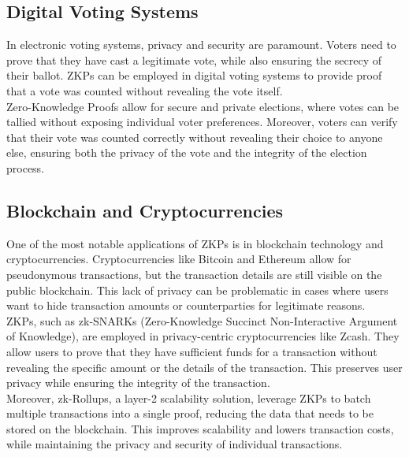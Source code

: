 \subsection{Digital Voting Systems}

In electronic voting systems, privacy and security are paramount. Voters need to prove that they have cast a legitimate vote, while also ensuring the secrecy of their ballot. ZKPs can be employed in digital voting systems to provide proof that a vote was counted without revealing the vote itself.
\\
Zero-Knowledge Proofs allow for secure and private elections, where votes can be tallied without exposing individual voter preferences. Moreover, voters can verify that their vote was counted correctly without revealing their choice to anyone else, ensuring both the privacy of the vote and the integrity of the election process.

\subsection{Blockchain and Cryptocurrencies}

One of the most notable applications of ZKPs is in blockchain technology and cryptocurrencies. Cryptocurrencies like Bitcoin and Ethereum allow for pseudonymous transactions, but the transaction details are still visible on the public blockchain. This lack of privacy can be problematic in cases where users want to hide transaction amounts or counterparties for legitimate reasons.
\\
ZKPs, such as zk-SNARKs (Zero-Knowledge Succinct Non-Interactive Argument of Knowledge), are employed in privacy-centric cryptocurrencies like Zcash. They allow users to prove that they have sufficient funds for a transaction without revealing the specific amount or the details of the transaction. This preserves user privacy while ensuring the integrity of the transaction.
\\
Moreover, zk-Rollups, a layer-2 scalability solution, leverage ZKPs to batch multiple transactions into a single proof, reducing the data that needs to be stored on the blockchain. This improves scalability and lowers transaction costs, while maintaining the privacy and security of individual transactions.